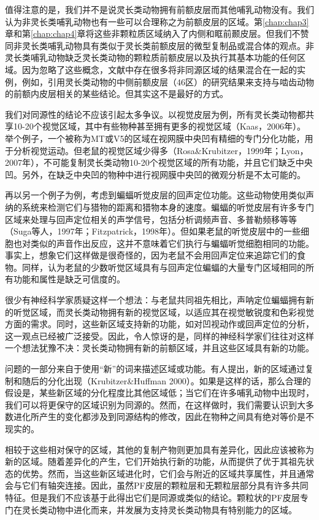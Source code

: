 值得注意的是，我们并不是说灵长类动物拥有前额皮层而其他哺乳动物没有。我们认为非灵长类哺乳动物也有一些可以合理称之为前额皮层的区域。第\ref{chap:chap3}章和第\ref{chap:chap4}章将这些非颗粒质区域纳入了内侧和眶前颞皮层。但我们不赞同非灵长类哺乳动物具有类似于灵长类前额皮层的微型复制品或混合体的观点。非灵长类哺乳动物缺乏灵长类动物的颗粒质前额皮层以及执行其基本功能的任何区域。因为忽略了这些概念，文献中存在很多将非同源区域的结果混合在一起的实例，例如，引用灵长类动物的中侧前额皮层（46区）的研究结果来支持与啮齿动物的前额内皮层相关的某些结论。但其实这不是最好的方式。

我们对同源性的结论不应该引起太多争议。以视觉皮层为例，所有灵长类动物都共享10-20个视觉区域，其中有些物种甚至拥有更多的视觉区域（Kaas，2006年）。举个例子，一个被称为MT或V5的区域在视网膜中央凹有精细的专门分化功能，用于分析视觉运动。但老鼠的视觉区域少得多（Rosa\&Krubitzer，1999年；Lyon，2007年），不可能复制灵长类动物10-20个视觉区域的所有功能，并且它们缺乏中央凹。另外，在缺乏中央凹的物种中进行视网膜中央凹的微观分析是不太可能的。

再以另一个例子为例，考虑到蝙蝠听觉皮层的回声定位功能。这些动物使用类似声纳的系统来检测它们与猎物的距离和猎物本身的速度。蝙蝠的听觉皮层有许多专门区域来处理与回声定位相关的声学信号，包括分析调频声音、多普勒频移等等（Suga等人，1997年；Fitzpatrick，1998年）。但如果老鼠的听觉皮层中的一些细胞也对类似的声音作出反应，这并不意味着它们执行与蝙蝠听觉细胞相同的功能。事实上，想象它们这样做是很奇怪的，因为老鼠不会用回声定位来追踪它们的食物。同样，认为老鼠的少数听觉区域具有与回声定位蝙蝠的大量专门区域相同的所有功能和属性是缺乏可信度的。

很少有神经科学家质疑这样一个想法：与老鼠共同祖先相比，声呐定位蝙蝠拥有新的听觉区域，而灵长类动物拥有新的视觉区域，以适应其在视觉敏锐度和色彩视觉方面的需求。同时，这些新区域支持新的功能，如对凹视动作或回声定位的分析，这一观点已经被广泛接受。因此，令人惊讶的是，同样的神经科学家们往往对这样一个想法犹豫不决：灵长类动物拥有新的前额区域，并且这些区域具有新的功能。

问题的一部分来自于使用“新”的词来描述区域或功能。有人提出，新的区域通过复制和随后的分化出现（Krubitzer\&Huffman 2000）。如果是这样的话，那么合理的假设是，某些新区域的分化程度比其他区域低；当它们在许多哺乳动物中出现时，我们可以将更保守的区域识别为同源的。然而，在这样做时，我们需要认识到大多数进化所产生的变化都涉及到同源结构的修改，因此在物种之间具有绝对等价是不现实的。

相较于这些相对保守的区域，其他的复制产物则更加具有差异化，因此应该被称为新的区域。随着差异化的产生，它们开始执行新的功能，从而提供了优于其祖先状态的优势。然而，当这些新区域进化时，它们会与附近的区域共享属性，并且通常会与它们有轴突连接。因此，虽然PF皮层的颗粒层和无颗粒层部分具有许多共同特征。但是我们不应该基于此得出它们是同源或类似的结论。颗粒状的PF皮层专门在灵长类动物中进化而来，并发展为支持灵长类动物具有特别能力的区域。

